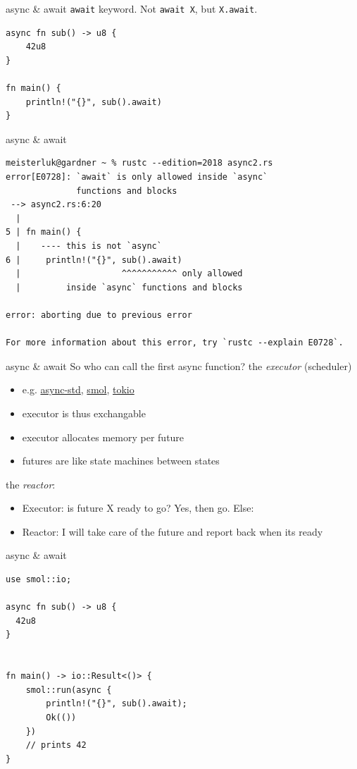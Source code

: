 \documentclass{beamer}
\begin{document}
\begin{frame}[fragile]{async \& await}
  \texttt{await} keyword.
  Not \texttt{await X}, but \texttt{X.await}.

  \begin{verbatim}
async fn sub() -> u8 {
    42u8
}

fn main() {
    println!("{}", sub().await)
}
  \end{verbatim}
\end{frame}

\begin{frame}[fragile]{async \& await}
  \begin{verbatim}
meisterluk@gardner ~ % rustc --edition=2018 async2.rs
error[E0728]: `await` is only allowed inside `async`
              functions and blocks
 --> async2.rs:6:20
  |
5 | fn main() {
  |    ---- this is not `async`
6 |     println!("{}", sub().await)
  |                    ^^^^^^^^^^^ only allowed
  |         inside `async` functions and blocks

error: aborting due to previous error

For more information about this error, try `rustc --explain E0728`.
  \end{verbatim}
\end{frame}

\begin{frame}[fragile]{async \& await}
  So who can call the first async function? the \emph{executor} (scheduler)
  \begin{itemize}
    \item e.g. \href{https://crates.io/crates/async-std}{async-std}, \href{https://crates.io/crates/smol}{smol}, \href{https://crates.io/crates/tokio}{tokio}
    \item executor is thus exchangable
    \item executor allocates memory per future
    \item futures are like state machines between states
  \end{itemize}
  the \emph{reactor}:
  \begin{itemize}
    \item Executor: is future X ready to go? Yes, then go. Else:
    \item Reactor: I will take care of the future and report back when its ready
  \end{itemize}
\end{frame}

\begin{frame}[fragile]{async \& await}
  \begin{verbatim}
use smol::io;
  
async fn sub() -> u8 {
  42u8
}


fn main() -> io::Result<()> {
    smol::run(async {
        println!("{}", sub().await);
        Ok(())
    })
    // prints 42
}
  \end{verbatim}
\end{frame}
\end{document}

